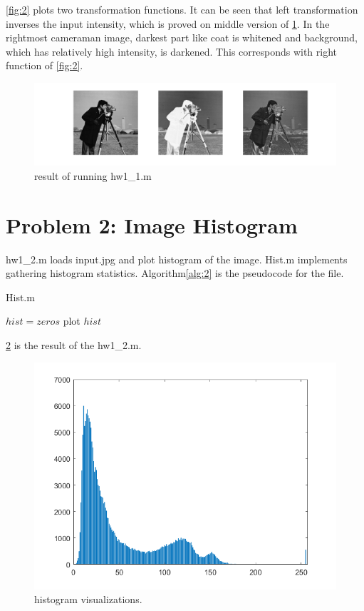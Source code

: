 \documentclass[extendedabs]{bmvc2k}
\begin{document}
\figurename{\ref{fig:2}} plots two transformation functions. It can be seen that left transformation
inverses the input intensity, which is proved on middle version of \figurename{\ref{fig:1}}.
In the rightmost cameraman image, darkest part like coat is whitened and background, which has relatively
high intensity, is darkened. This corresponds with right function of \figurename{\ref{fig:2}}.  

\begin{figure}[h]
    \centering
    \includegraphics[width=\linewidth]{hw1_1}
    \caption{result of running hw1\_1.m}
    \label{fig:1}
    \vspace{-2mm}
\end{figure}

\section*{Problem 2: Image Histogram}

hw1\_2.m loads input.jpg and plot histogram of the image.
Hist.m implements gathering histogram statistics.
Algorithm\ref{alg:2} is the pseudocode for the file.

\begin{algorithm}
\caption{Hist.m}
\label{alg:2}
$hist = zeros$\;
plot $hist$\;
\end{algorithm}

\figurename{\ref{fig:3}} is the result of the hw1\_2.m. 

\begin{figure}[h]
    \centering
    \includegraphics[width=0.8\linewidth]{hw1_2}
    \caption{histogram visualizations.}
    \label{fig:3}
    \vspace{-2mm}
\end{figure}
\end{document}
